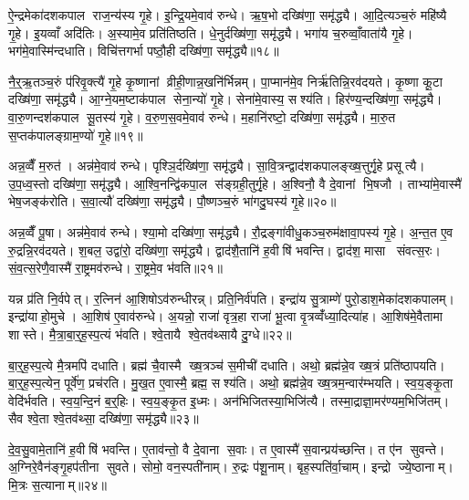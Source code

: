 ऐ॒न्द्रमेका॑दशकपाल राज॒न्य॑स्य गृ॒हे। इ॒न्द्रि॒यमे॒वाव॑ रुन्धे। ऋ॒ष॒भो दख्षि॑णा॒ समृ॑द्ध्यै। आ॒दि॒त्यञ्च॒रुं महि॑ष्यै गृ॒हे। इ॒यव्वाँ अदि॑तिः। अ॒स्यामे॒व प्रति॑तिष्ठति। धे॒नुर्दख्षि॑णा॒ समृ॑द्ध्यै। भगा॑य च॒रुव्वाँ॒वाता॑यै गृ॒हे। भग॑मे॒वास्मि॑न्दधाति। विचि॑त्तगर्भा पष्ठौ॒ही दख्षि॑णा॒ समृ॑द्ध्यै॥१८॥

नै॒र्॒ऋ॒तञ्च॒रुं प॑रिवृ॒क्त्यै॑ गृ॒हे कृ॒ष्णानां व्रीही॒णान्न॒खनि॑र्भिन्नम्। पा॒प्मान॑मे॒व निर्\mbox{}ऋ॑तिन्नि॒रव॑दयते। कृ॒ष्णा कू॒टा दख्षि॑णा॒ समृ॑द्ध्यै। आ॒ग्ने॒यम॒ष्टाक॑पाल सेना॒न्यो॑ गृ॒हे। सेना॑मे॒वास्य॒ सश्य॑ति। हिर॑ण्य॒न्दख्षि॑णा॒ समृ॑द्ध्यै। वा॒रु॒णन्दश॑कपाल सू॒तस्य॑ गृ॒हे। व॒रु॒ण॒स॒वमे॒वाव॑ रुन्धे। म॒हानि॑रष्टो॒ दख्षि॑णा॒ समृ॑द्ध्यै। मा॒रु॒त स॒प्तक॑पालङ्ग्राम॒ण्यो॑ गृ॒हे॥१९॥

अन्न॒व्वैँ म॒रुत॑। अन्न॑मे॒वाव॑ रुन्धे। पृश्ञि॒र्दख्षि॑णा॒ समृ॑द्ध्यै। सा॒वि॒त्रन्द्वाद॑शकपालङ्ख्ष॒त्तुर्गृ॒हे प्रसूत्यै। उ॒प॒ध्व॒स्तो दख्षि॑णा॒ समृ॑द्ध्यै। आ॒श्वि॒नन्द्वि॑कपा॒ल स॑ङ्ग्रही॒तुर्गृ॒हे। अ॒श्विनौ॒ वै दे॒वानां भि॒षजौ। ताभ्या॑मे॒वास्मै॑ भेष॒जङ्क॑रोति। स॒वा॒त्यौ॑ दख्षि॑णा॒ समृ॑द्ध्यै। पौ॒ष्णञ्च॒रुं भा॑गदु॒घस्य॑ गृ॒हे॥२०॥

अन्न॒व्वैँ पू॒षा। अन्न॑मे॒वाव॑ रुन्धे। श्या॒मो दख्षि॑णा॒ समृ॑द्ध्यै। रौ॒द्रङ्गा॑वीधु॒कञ्च॒रुम॑क्षावा॒पस्य॑ गृ॒हे। अ॒न्त॒त ए॒व रु॒द्रन्नि॒रव॑दयते। श॒बल॒ उद्वा॑रो॒ दख्षि॑णा॒ समृ॑द्ध्यै। द्वाद॑शै॒तानि॑ ह॒वीषि॑ भवन्ति। द्वाद॑श॒ मासा संवत्स॒रः। सं॒व॒त्स॒रेणै॒वास्मै॑ रा॒ष्ट्रमव॑रुन्धे। रा॒ष्ट्रमे॒व भ॑वति॥२१॥

यन्न प्र॑ति नि॒र्वपेत्। र॒त्निन॑ आ॒शिषोऽव॑रुन्धीरन्न्। प्रति॒निर्व॑पति। इन्द्रा॑य सु॒त्राम्णे॑ पुरो॒डाश॒मेका॑दशकपालम्। इन्द्रा॑याहो॒मुचे। आ॒शिष॑ ए॒वाव॑रुन्धे। अ॒यन्नो॒ राजा॑ वृत्र॒हा राजा॑ भू॒त्वा वृ॒त्रव्वँ॑ध्या॒दित्या॑ह। आ॒शिष॑मे॒वैतामा शास्ते। मै॒त्रा॒बा॒र्॒ह॒स्प॒त्यं भ॑वति। श्वे॒तायै श्वे॒तव॑थ्सायै दु॒ग्धे॥२२॥

बा॒र्॒ह॒स्प॒त्ये मै॒त्रमपि॑ दधाति। ब्रह्म॑ चै॒वास्मै ख्ष॒त्रञ्च॑ स॒मीची॑ दधाति। अथो॒ ब्रह्म॑न्ने॒व ख्ष॒त्रं प्रति॑ष्ठापयति। बा॒र्॒ह॒स्प॒त्येन॒ पूर्वे॑ण॒ प्रच॑रति। मु॒ख॒त ए॒वास्मै॒ ब्रह्म॒ सश्य॑ति। अथो॒ ब्रह्म॑न्ने॒व ख्ष॒त्रम॒न्वार॑म्भयति। स्व॒य॒ङ्कृ॒ता वेदि॑र्भवति। स्व॒य॒न्दि॒नं ब॒र्॒हिः। स्व॒य॒ङ्कृ॒त इ॒ध्मः। अन॑भिजितस्या॒भिजि॑त्यै। तस्मा॒द्राज्ञा॒मर॑ण्यम॒भिजि॑तम्। सैव श्वे॒ता श्वे॒तव॑थ्सा॒ दख्षि॑णा॒ समृ॑द्ध्यै॥२३॥\anuvakamend[र॒त्नि॒त्वाय॒ समृ॑द्ध्यै पष्ठौ॒ही दख्षि॑णा॒ समृ॑द्ध्यै ग्राम॒ण्यो॑ गृ॒हे भा॑गदु॒घस्य॑ गृ॒हे भ॑वति दु॒ग्धे॑ऽभिजि॑त्यै॒ द्वे च॑]

दे॒व॒सु॒वामे॒तानि॑ ह॒वीषि॑ भवन्ति। ए॒ताव॑न्तो॒ वै दे॒वाना स॒वाः। त ए॒वास्मै॑ स॒वान्प्रय॑च्छन्ति। त ए॑न सुवन्ते। अ॒ग्निरे॒वैन॑ङ्गृ॒हप॑तीना सुवते। सोमो॒ वन॒स्पती॑नाम्। रु॒द्रः प॑शू॒नाम्। बृह॒स्पति॑र्वा॒चाम्। इन्द्रो ज्ये॒ष्ठानाम्। मि॒त्रः स॒त्यानाम्॥२४॥

